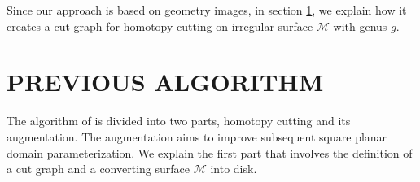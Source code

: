 \documentclass[a4paper,twoside]{article}
\begin{document}
Since our approach is based on geometry images, in section \ref{sec:previous algorithm}, we explain how it creates a cut graph for homotopy cutting on irregular surface $\mathscr{M}$ with genus $g$.
\section{\uppercase{Previous Algorithm}}
\label{sec:previous algorithm}
\noindent The algorithm of \cite{Gu:2002:GI:566654.566589} is divided into two parts, homotopy cutting and its augmentation. The augmentation aims to improve subsequent square planar domain parameterization. We explain the first part that involves the definition of a cut graph and a converting surface $\mathscr{M}$ into disk.

\begin{figure}[t]
	\centering		
	\hspace{10pt}
	\hspace{0.000\columnwidth}
	\hspace{10pt}		
	\hspace{0.000\columnwidth}
	\hspace{10pt}		

\end{figure}
\end{document}
